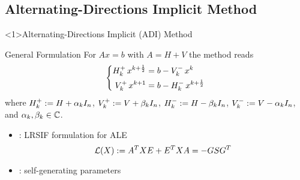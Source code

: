 \subsection{Alternating-Directions Implicit Method}

\begin{frame}<1>{Alternating-Directions Implicit (ADI) Method}
\begin{bigpicturecols}
  \begin{block}{General Formulation \parencite{Peaceman1955}}
    For $Ax=b$ with $A = H+V$ the method reads
    \begin{equation*}
    \left\{
    \begin{aligned}
      \mathop{H_k^+}  x^{k+\frac{1}{2}} &= b - \mathop{V_k^-} x^k \\
      \mathop{V_k^+} x^{k+1}           &= b - \mathop{H_k^-} x^{k+\frac{1}{2}}
    \end{aligned}
    \right.
    \end{equation*}
    where
    $\mathop{H_k^+}  := H + \alpha_k I_n$,
    $\mathop{V_k^+} := V + \beta_k  I_n$,
    $\mathop{H_k^-}  := H - \beta_k  I_n$,
    $\mathop{V_k^-} := V - \alpha_k I_n$,
    and $\alpha_k, \beta_k\in\mathbb{C}$.
  \end{block}
  \begin{itemize}
    \item
      \cite{Lang2017}: LRSIF formulation for ALE
      \begin{equation*}
        \operatorname{\mathcal L}(X) := A^T X E + E^T X A = -GSG^T
      \end{equation*}
    \item
      \cite{Kuerschner2016}: self-generating parameters
  \end{itemize}
\column{\bigpicturewidth}
\end{bigpicturecols}
\end{frame}
